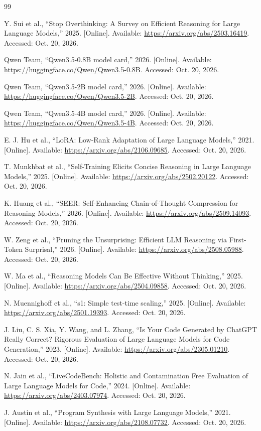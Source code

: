 \documentclass[11pt,letterpaper]{article}
\begin{document}
\begin{thebibliography}{99}

 Y. Sui et al., ``Stop Overthinking: A Survey on Efficient Reasoning for Large Language Models,'' 2025. [Online]. Available: \url{https://arxiv.org/abs/2503.16419}. Accessed: Oct. 20, 2026.

 Qwen Team, ``Qwen3.5-0.8B model card,'' 2026. [Online]. Available: \url{https://huggingface.co/Qwen/Qwen3.5-0.8B}. Accessed: Oct. 20, 2026.

 Qwen Team, ``Qwen3.5-2B model card,'' 2026. [Online]. Available: \url{https://huggingface.co/Qwen/Qwen3.5-2B}. Accessed: Oct. 20, 2026.

 Qwen Team, ``Qwen3.5-4B model card,'' 2026. [Online]. Available: \url{https://huggingface.co/Qwen/Qwen3.5-4B}. Accessed: Oct. 20, 2026.

 E. J. Hu et al., ``LoRA: Low-Rank Adaptation of Large Language Models,'' 2021. [Online]. Available: \url{https://arxiv.org/abs/2106.09685}. Accessed: Oct. 20, 2026.

 T. Munkhbat et al., ``Self-Training Elicits Concise Reasoning in Large Language Models,'' 2025. [Online]. Available: \url{https://arxiv.org/abs/2502.20122}. Accessed: Oct. 20, 2026.

 K. Huang et al., ``SEER: Self-Enhancing Chain-of-Thought Compression for Reasoning Models,'' 2026. [Online]. Available: \url{https://arxiv.org/abs/2509.14093}. Accessed: Oct. 20, 2026.

 W. Zeng et al., ``Pruning the Unsurprising: Efficient LLM Reasoning via First-Token Surprisal,'' 2026. [Online]. Available: \url{https://arxiv.org/abs/2508.05988}. Accessed: Oct. 20, 2026.

 W. Ma et al., ``Reasoning Models Can Be Effective Without Thinking,'' 2025. [Online]. Available: \url{https://arxiv.org/abs/2504.09858}. Accessed: Oct. 20, 2026.

 N. Muennighoff et al., ``s1: Simple test-time scaling,'' 2025. [Online]. Available: \url{https://arxiv.org/abs/2501.19393}. Accessed: Oct. 20, 2026.

 J. Liu, C. S. Xia, Y. Wang, and L. Zhang, ``Is Your Code Generated by ChatGPT Really Correct? Rigorous Evaluation of Large Language Models for Code Generation,'' 2023. [Online]. Available: \url{https://arxiv.org/abs/2305.01210}. Accessed: Oct. 20, 2026.

 N. Jain et al., ``LiveCodeBench: Holistic and Contamination Free Evaluation of Large Language Models for Code,'' 2024. [Online]. Available: \url{https://arxiv.org/abs/2403.07974}. Accessed: Oct. 20, 2026.

 J. Austin et al., ``Program Synthesis with Large Language Models,'' 2021. [Online]. Available: \url{https://arxiv.org/abs/2108.07732}. Accessed: Oct. 20, 2026.

\end{thebibliography}
\end{document}
